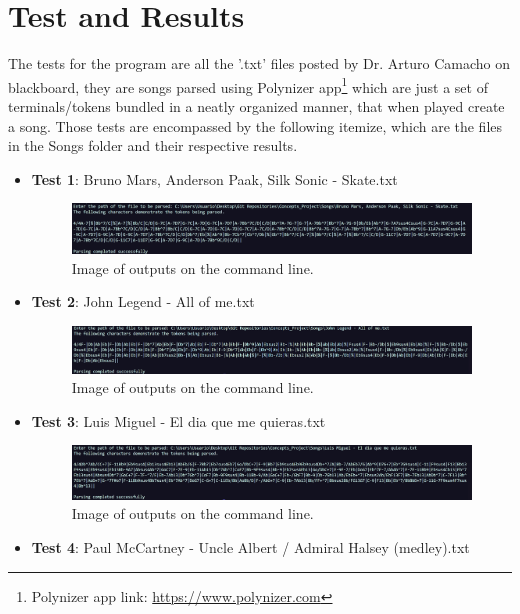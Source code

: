 \documentclass{article}
\begin{document}
\section{Test and Results} \label{fig:Results}
The tests for the program are all the '.txt' files posted by Dr. Arturo Camacho on blackboard, they are songs parsed using Polynizer app\footnote{Polynizer app link: \url{https://www.polynizer.com}} which are just a set of terminals/tokens bundled in a neatly organized manner, that when played create a song. Those tests are encompassed by the following itemize, which are the files in the Songs folder and their respective results. 
\begin{itemize}
    \item \textbf{Test 1}: Bruno Mars, Anderson Paak, Silk Sonic - Skate.txt
    \begin{figure}[H]
        \centering
        \includegraphics[width=1\textwidth]{Image_SkateParsed.png}
        \caption{Image of outputs on the command line.}
    \end{figure}
    \item \textbf{Test 2}: John Legend - All of me.txt
    \begin{figure}[H]
        \centering
        \includegraphics[width=1\textwidth]{Image_AllOfMeParsed.png}
        \caption{Image of outputs on the command line.}
    \end{figure}
    \item \textbf{Test 3}: Luis Miguel - El dia que me quieras.txt
    \begin{figure}[H]
        \centering
        \includegraphics[width=1\textwidth]{Image_ElDiaQueMeQuiera.png}
        \caption{Image of outputs on the command line.}
    \end{figure}
    \item \textbf{Test 4}: Paul McCartney - Uncle Albert / Admiral Halsey (medley).txt

\end{itemize}
\end{document}
